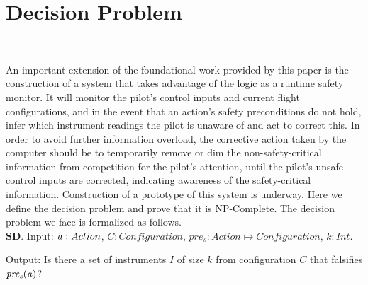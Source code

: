 

\section{Decision Problem}~\label{decisionproblem}
\noindent

An important extension of the foundational work provided by this paper is the construction of a system that takes advantage of the logic as a runtime safety monitor. It will monitor the pilot's control inputs and current flight configurations, and in the event that an action's safety preconditions do not hold, infer which instrument readings the pilot is unaware of and act to correct this. In order to avoid further information overload, the corrective action taken by the computer should be to temporarily remove or dim the non-safety-critical information from competition for the pilot's attention, until the pilot's unsafe control inputs are corrected, indicating awareness of the safety-critical information. Construction of a prototype of this system is underway. Here we define the decision problem and prove that it is NP-Complete.
The decision problem we face is formalized as follows.\\
$\mathbf{SD}$. 
Input: $\mathit{a}: Action$, $\mathit{C: Configuration}$, $\mathit{pre_s}: Action \mapsto Configuration$, $k: \mathit{Int}$.

Output: Is there a set of instruments $I$ of size $k$ from configuration $C$ that falsifies $\mathit{pre_s}(\mathit{a})$?


